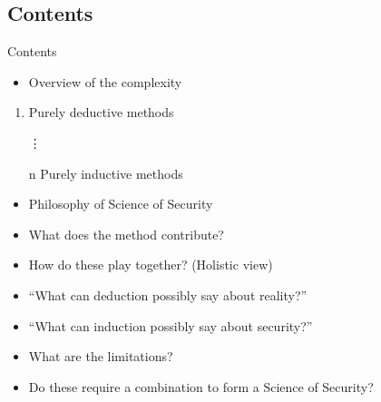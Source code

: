 \subsection{Contents}

\begin{frame}
  \begin{block}{Contents}
    \begin{itemize}
      \item Overview of the complexity
    \end{itemize}
    \begin{enumerate}
      \item Purely deductive methods
      \item[\vdots]
      \item[n] Purely inductive methods
    \end{enumerate}
    \begin{itemize}
      \item {Philosophy of Science of Security}
    \end{itemize}
  \end{block}

  \pause

  \begin{remark}
    \begin{itemize}
      \item What does the method contribute?
      \item How do these play together? (Holistic view)
    \end{itemize}
  \end{remark}
\end{frame}

\begin{frame}
  \begin{example}
    \begin{itemize}
      \item \enquote{What can deduction possibly say about reality?}
    \end{itemize}
  \end{example}

  \pause

  \begin{example}
    \begin{itemize}
      \item \enquote{What can induction possibly say about security?}
    \end{itemize}
  \end{example}

  \pause

  \begin{remark}[To focus on]
    \begin{itemize}
      \item What are the limitations?
      \item Do these require a combination to form a Science of Security?
    \end{itemize}
  \end{remark}
\end{frame}

